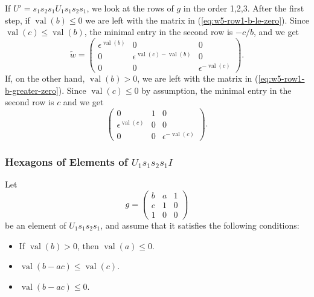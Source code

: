 \documentclass{amsart}
\theoremstyle{definition}
\def\e{\epsilon}
\def\w{\widetilde{w}}
\def\val{\mathop{\mathrm{val}}}
\begin{document}
  If $U' = s_1s_2s_1 U_1 s_1s_2s_1$, we look at the rows of $g$ in the order
  1,2,3.  After the first step, if $\val(b) \le 0$ we are left with the matrix
  in (\ref{eq:w5-row1-b-le-zero}).  Since $\val(c) \le \val(b)$, the minimal
  entry in the second row is $-c/b$, and we get
  \begin{equation*}
    \w = \begin{pmatrix}
      \e^{\val(b)} & 0 & 0 \\
      0 & \e^{\val(c) - \val(b)} & 0 \\
      0 & 0 & \e^{-\val(c)}
    \end{pmatrix}.
  \end{equation*}
  If, on the other hand, $\val(b) > 0$, we are left with the matrix in
  (\ref{eq:w5-row1-b-greater-zero}).  Since $\val(c) \le 0$ by assumption, the
  minimal entry in the second row is $c$ and we get
  \begin{equation*}
    \begin{pmatrix}
      0 & 1 & 0 \\
      \e^{\val(c)} & 0 & 0 \\
      0 & 0 & \e^{-\val(c)} 
    \end{pmatrix}.
  \end{equation*}

  \subsubsection{Hexagons of Elements of $U_1 s_1 s_2 s_1 I$}
  \label{sec:hexagons-u-s1-s2-s1}
  Let
  \begin{equation*}
    g =
    \begin{pmatrix}
      b & a & 1 \\
      c & 1 & 0 \\
      1 & 0 & 0
    \end{pmatrix}
  \end{equation*}
  be an element of $U_1 s_1s_2s_1$, and assume that it satisfies the following
  conditions:
  \begin{itemize}
    \item If $\val(b) > 0$, then $\val(a) \le 0$.
    \item $\val(b-ac) \le \val(c)$.
    \item $\val(b-ac) \le 0$.
  \end{itemize}
\end{document}
